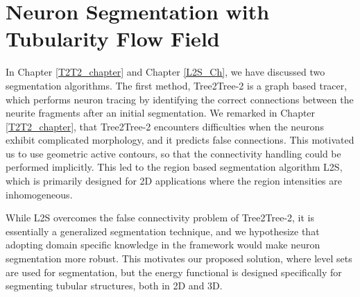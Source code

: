 \chapter{Neuron Segmentation with Tubularity Flow Field} %

\label{TuFF_chapter} %


In Chapter \ref{T2T2_chapter} and Chapter \ref{L2S_Ch}, we have discussed two segmentation algorithms. The first method, Tree2Tree-2 is a graph based tracer, which performs neuron tracing by identifying the correct connections between the neurite fragments after an initial segmentation. We remarked in Chapter \ref{T2T2_chapter}, that Tree2Tree-2 encounters difficulties when the neurons exhibit complicated morphology, and it predicts false connections. This motivated us to use geometric active contours, so that the connectivity handling could be performed implicitly. This led to the region based segmentation algorithm L2S, which is primarily designed for 2D applications where the region intensities are inhomogeneous. 

While L2S overcomes the false connectivity problem of Tree2Tree-2, it is essentially a generalized segmentation technique, and we hypothesize that adopting domain specific knowledge in the framework would make neuron segmentation more robust. This motivates our proposed solution, where level sets are used for segmentation, but the energy functional is designed specifically for segmenting tubular structures, both in 2D and 3D.

